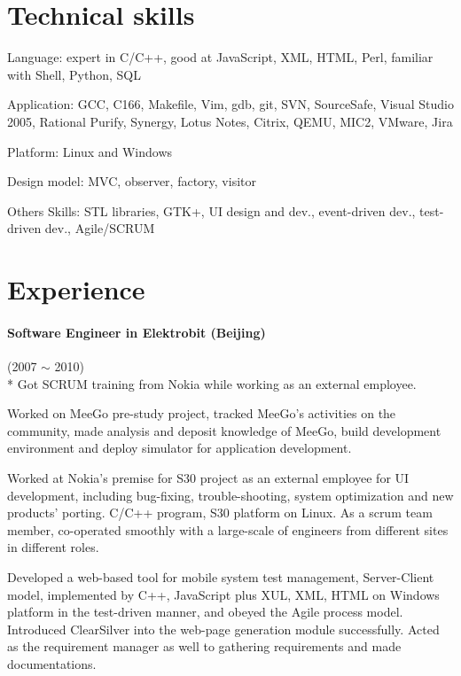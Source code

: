 \documentclass[a4paper,11pt]{article}
\begin{document}
\section*{Technical skills}
\begin{description*}
    \setlength\itemindent{0cm}
    \setlength\itemsep{0.4em}
  \item [Language:] expert in C/C++, good at JavaScript, XML, HTML, Perl, familiar with Shell, Python, SQL
  \item [Application:] GCC, C166, Makefile, Vim, gdb, git, SVN, SourceSafe, Visual Studio 2005, Rational Purify, Synergy, Lotus Notes, Citrix, QEMU, MIC2, VMware, Jira
  \item [Platform:] Linux and Windows
  \item [Design model:] MVC, observer, factory, visitor
  \item [Others Skills:] STL libraries, GTK+, UI design and dev., event-driven dev., test-driven dev., Agile/SCRUM
\end{description*}

\section*{Experience}

\paragraph{Software Engineer in Elektrobit (Beijing)} (2007 $\sim$ 2010) \\*
Got SCRUM training from Nokia while working as an external employee.
\begin{itemize*}
    \setlength\itemsep{0.4em}
  \item Worked on MeeGo pre-study project, tracked MeeGo's activities on the community, made analysis and deposit knowledge of MeeGo, build development environment and deploy simulator for application development.
  \item Worked at Nokia's premise for S30 project as an external employee for UI development, including bug-fixing, trouble-shooting, system optimization and new products' porting. C/C++ program, S30 platform on Linux. As a scrum team member, co-operated smoothly with a large-scale of engineers from different sites in different roles.
  \item Developed a web-based tool for mobile system test management, Server-Client model, implemented by C++, JavaScript plus XUL, XML, HTML on Windows platform in the test-driven manner, and obeyed the Agile process model. Introduced ClearSilver into the web-page generation module successfully. Acted as the requirement manager as well to gathering requirements and made documentations.
\end{itemize*}
\end{document}

